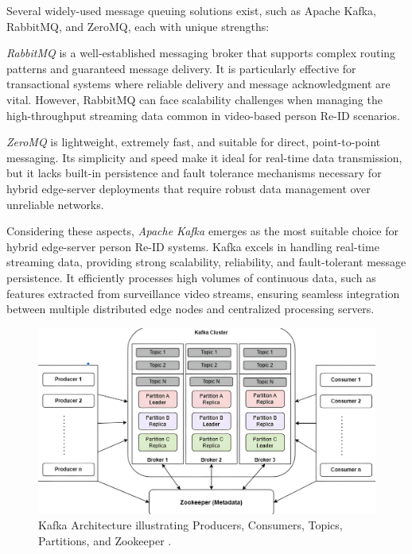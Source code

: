 \documentclass[../main.tex]{subfiles}
\begin{document}
Several widely-used message queuing solutions exist, such as Apache Kafka, RabbitMQ, and ZeroMQ, each with unique strengths:

\textit{RabbitMQ} \cite{rabbitmq_intro} is a well-established messaging broker that supports complex routing patterns and guaranteed message delivery. It is particularly effective for transactional systems where reliable delivery and message acknowledgment are vital. However, RabbitMQ can face scalability challenges when managing the high-throughput streaming data common in video-based person Re-ID scenarios.

\textit{ZeroMQ} \cite{zeromq_intro} is lightweight, extremely fast, and suitable for direct, point-to-point messaging. Its simplicity and speed make it ideal for real-time data transmission, but it lacks built-in persistence and fault tolerance mechanisms necessary for hybrid edge-server deployments that require robust data management over unreliable networks.

Considering these aspects, \textit{Apache Kafka} \cite{kafka_intro} emerges as the most suitable choice for hybrid edge-server person Re-ID systems. Kafka excels in handling real-time streaming data, providing strong scalability, reliability, and fault-tolerant message persistence. It efficiently processes high volumes of continuous data, such as features extracted from surveillance video streams, ensuring seamless integration between multiple distributed edge nodes and centralized processing servers.

\begin{figure}[htbp]
    \centering
    \includegraphics[width=1\textwidth]{Figure/kafka-fig.png}
    \caption{Kafka Architecture illustrating Producers, Consumers, Topics, Partitions, and Zookeeper \cite{whatiskafka}.}
    \label{fig:kafka_architecture}
\end{figure}
\end{document}
